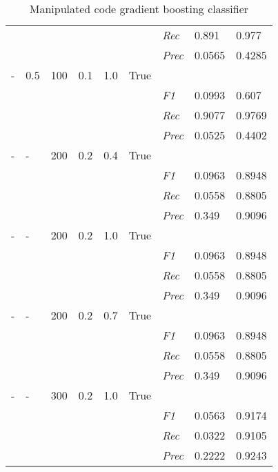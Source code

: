 \begin{table}[]
\begin{tabularx}{\textwidth}{XXXXXX|X|X|X}
& & & & & & \textit{Rec} &  0.891 & 0.977    \\
& & & & & & \textit{Prec} & 0.0565 & 0.4285  \\ \midrule
- & 0.5 & 100 & 0.1 & 1.0 &True & & &  \\
& & & & & & \textit{F1} & 0.0993 & 0.607        \\
& & & & & & \textit{Rec} &  0.9077 & 0.9769    \\
& & & & & & \textit{Prec} & 0.0525 & 0.4402  \\ \midrule
- & - & 200 & 0.2 & 0.4 &True & & &  \\
& & & & & & \textit{F1} & 0.0963 & 0.8948        \\
& & & & & & \textit{Rec} &  0.0558 & 0.8805    \\
& & & & & & \textit{Prec} & 0.349 & 0.9096  \\ \midrule
- & - & 200 & 0.2 & 1.0 &True & & &  \\
& & & & & & \textit{F1} & 0.0963 & 0.8948        \\
& & & & & & \textit{Rec} &  0.0558 & 0.8805    \\
& & & & & & \textit{Prec} & 0.349 & 0.9096  \\ \midrule
- & - & 200 & 0.2 & 0.7 &True & & &  \\
& & & & & & \textit{F1} & 0.0963 & 0.8948        \\
& & & & & & \textit{Rec} &  0.0558 & 0.8805    \\
& & & & & & \textit{Prec} & 0.349 & 0.9096  \\ \midrule
- & - & 300 & 0.2 & 1.0 &True & & &  \\
& & & & & & \textit{F1} & 0.0563 & 0.9174        \\
& & & & & & \textit{Rec} &  0.0322 & 0.9105    \\
& & & & & & \textit{Prec} & 0.2222 & 0.9243  \\ \midrule
\end{tabularx}
\caption{Manipulated code gradient boosting classifier}
\label{tab:rq3_gradient_boosting_classifier}
\end{table}


